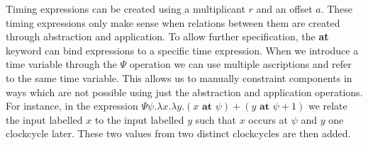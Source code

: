 Timing expressions can be created using a multiplicant $r$ and an offset $a$.
These timing expressions only make sense when relations between them are created through abstraction and application.
To allow further specification, the \textbf{at} keyword can bind expressions to a specific time expression.
When we introduce a time variable through the $\Psi$ operation we can use multiple ascriptions and refer to the same time variable.
This allows us to manually constraint components in ways which are not possible using just the abstraction and application operations.
For instance, in the expression $\Psi \psi. \lambda x. \lambda y. (x \textbf{ at } \psi) + (y \textbf{ at } \psi + 1)$ we relate the input labelled $x$ to the input labelled $y$ such that $x$ occurs at $\psi$ and $y$ one clockcycle later. These two values from two distinct clockcycles are then added.

